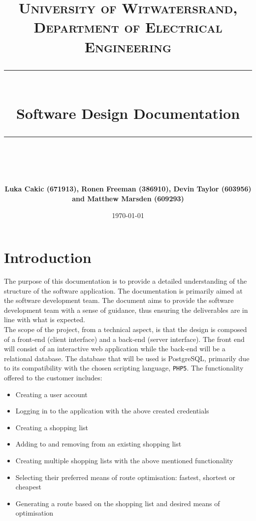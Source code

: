 \documentclass[10pt, a4paper, onecolumn]{scrartcl}
\newcommand{\horrule}[1]{\rule{\linewidth}{#1}}
\begin{document}
	
	\title{\normalfont \normalsize
		\textsc{University of Witwatersrand, Department of Electrical Engineering} \\ [10pt]
		\horrule{0.5pt} \\ [10pt]
		\huge Software Design Documentation \\
		\horrule{2pt} \\ [10pt]}
	\author{\textbf{\normalsize{Luka Cakic (671913), Ronen Freeman (386910), Devin Taylor (603956) and Matthew Marsden (609293)}} \\ [10pt]}
	\date {\normalsize \today}
	
	\maketitle
	
	\section{Introduction}
	
		The purpose of this documentation is to provide a detailed understanding of the structure of the software application. The documentation is primarily aimed at the software development team. The document aims to provide the software development team with a sense of guidance, thus ensuring the deliverables are in line with what is expected. \\
		
		The scope of the project, from a technical aspect, is that the design is composed of a front-end (client interface) and a back-end (server interface). The front end will consist of an interactive web application while the back-end will be a relational database. The database that will be used is PostgreSQL, primarily due to its compatibility with the chosen scripting language, \texttt{PHP5}. The functionality offered to the customer includes:
		
		\begin{itemize}
			\item Creating a user account
			\item Logging in to the application with the above created credentials
			\item Creating a shopping list
			\item Adding to and removing from an existing shopping list
			\item Creating multiple shopping lists with the above mentioned functionality
			\item Selecting their preferred means of route optimisation: fastest, shortest or cheapest
			\item Generating a route based on the shopping list and desired means of optimisation
		\end{itemize}
		
\end{document}
